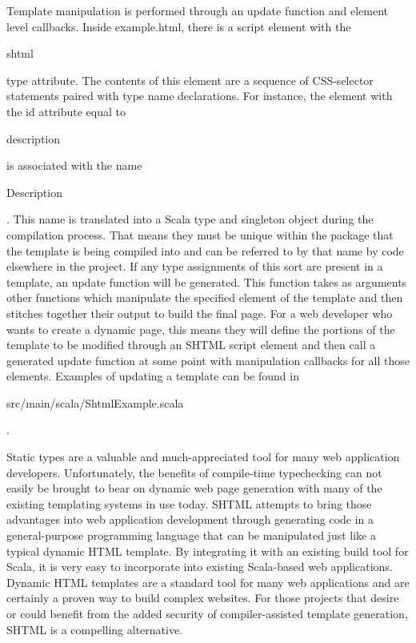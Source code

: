 \documentclass{article}
\begin{document}
Template manipulation is performed through an update function and element level callbacks. Inside example.html, there is a script element with the \begin{tt}shtml\end{tt} type attribute. The contents of this element are a sequence of CSS-selector statements paired with type name declarations. For instance, the element with the id attribute equal to \begin{tt}description\end{tt} is associated with the name \begin{tt}Description\end{tt}. This name is translated into a Scala type and singleton object during the compilation process. That means they must be unique within the package that the template is being compiled into and can be referred to by that name by code elsewhere in the project. If any type assignments of this sort are present in a template, an update function will be generated. This function takes as arguments other functions which manipulate the specified element of the template and then stitches together their output to build the final page. For a web developer who wants to create a dynamic page, this means they will define the portions of the template to be modified through an SHTML script element and then call a generated update function at some point with manipulation callbacks for all those elements. Examples of updating a template can be found in \begin{tt}src/main/scala/ShtmlExample.scala\end{tt}.

Static types are a valuable and much-appreciated tool for many web application developers. Unfortunately, the benefits of compile-time typechecking can not easily be brought to bear on dynamic web page generation with many of the existing templating systems in use today. SHTML attempts to bring those advantages into web application development through generating code in a general-purpose programming language that can be manipulated just like a typical dynamic HTML template. By integrating it with an existing build tool for Scala, it is very easy to incorporate into existing Scala-based web applications. Dynamic HTML templates are a standard tool for many web applications and are certainly a proven way to build complex websites. For those projects that desire or could benefit from the added security of compiler-assisted template generation, SHTML is a compelling alternative. 
\end{document}
